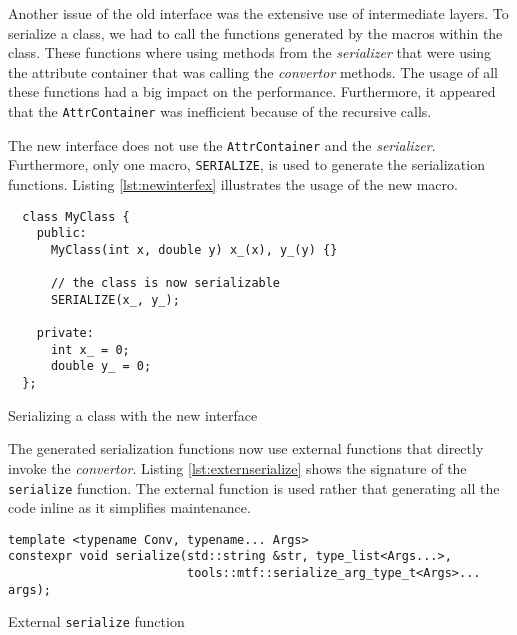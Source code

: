 Another issue of the old interface was the extensive use of intermediate layers.
To serialize a class, we had to call the functions generated by the macros
within the class. These functions where using methods from the
\textit{serializer} that were using the attribute container that was calling the
\textit{convertor} methods. The usage of all these functions had a big impact on
the performance. Furthermore, it appeared that the \texttt{AttrContainer} was
inefficient because of the recursive calls.

The new interface does not use the \texttt{AttrContainer} and the
\textit{serializer}. Furthermore, only one macro, \texttt{SERIALIZE}, is used to
generate the serialization functions. Listing \ref{lst:newinterfex} illustrates
the usage of the new macro.

\begin{listing}[ht!]
\begin{verbatim}
  class MyClass {
    public:
      MyClass(int x, double y) x_(x), y_(y) {}

      // the class is now serializable
      SERIALIZE(x_, y_);

    private:
      int x_ = 0;
      double y_ = 0;
  };
\end{verbatim}
\caption{Serializing a class with the new interface}
\label{lst:newinterfex}
\end{listing}

The generated serialization functions now use external functions that directly
invoke the \textit{convertor}. Listing \ref{lst:externserialize} shows the
signature of the \texttt{serialize} function. The external function is used
rather that generating all the code inline as it simplifies maintenance.

\clearpage{}
\begin{listing}[ht!]
\begin{verbatim}
template <typename Conv, typename... Args>
constexpr void serialize(std::string &str, type_list<Args...>,
                         tools::mtf::serialize_arg_type_t<Args>... args);
\end{verbatim}
\caption{External \texttt{serialize} function}
\label{lst:externserialize}
\end{listing}

